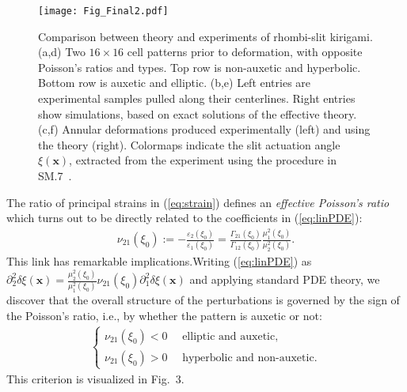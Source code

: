 \documentclass[aps,prl,twocolumn,superscriptaddress]{revtex4-1}
\begin{document}
 \begin{figure*}
\centering
\texttt{[image: Fig\_Final2.pdf]}
\caption{Comparison between theory and experiments of rhombi-slit kirigami. (a,d) Two $16\times16$ cell patterns prior to deformation, with opposite Poisson's ratios and types. Top row is non-auxetic and hyperbolic. Bottom row is auxetic and elliptic. (b,e) Left entries are experimental samples pulled along their centerlines. Right entries show simulations, based on exact solutions of the effective theory. (c,f) Annular deformations produced experimentally (left) and using the theory (right). Colormaps indicate the slit actuation angle $\xi(\mathbf{x})$, extracted from the experiment using the procedure in SM.7~\cite{suppl}.}
\label{fig:FinalFig}
\end{figure*} 

The ratio of principal strains in (\ref{eq:strain}) defines an \textit{effective Poisson's ratio} which turns out to be  directly related to the coefficients in (\ref{eq:linPDE}):
\begin{equation}\label{eq:firstPoissons}
    \begin{aligned}
    \nu_{21}(\xi_0) := -\frac{\varepsilon_2(\xi_0)}{\varepsilon_1(\xi_0)} = \frac{\Gamma_{21}(\xi_{0})}{\Gamma_{12}(\xi_0)}\frac{\mu_1^2(\xi_0)}{\mu_2^2(\xi_0)}.
    \end{aligned}
\end{equation}
This link has remarkable implications.\;Writing  (\ref{eq:linPDE})  as $\partial_2^2 \delta \xi(\mathbf{x}) = \tfrac{\mu_2^2(\xi_0)}{\mu_1^2(\xi_0)}\nu_{21}(\xi_0) \partial_1^2 \delta \xi(\mathbf{x})$ and applying standard PDE theory, we discover that the overall structure of the perturbations is governed by the sign of the Poisson's ratio, i.e., by whether the pattern is auxetic or not:
\begin{equation}
    \begin{aligned}
    \begin{cases}\label{eq:Poissons}
    \nu_{21}(\xi_0) < 0 \quad \text{ elliptic and auxetic},   \\
    \nu_{21}(\xi_0) > 0 \quad  \text{ hyperbolic and non-auxetic}.
    \end{cases}
    \end{aligned}
\end{equation}
This criterion is visualized in Fig.~3.



\end{document}
